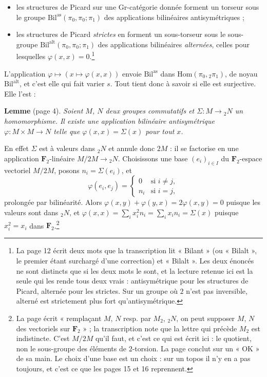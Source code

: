 \documentclass[11pt,a4paper]{article}
\begin{document}
\begin{itemize}
\item les structures de Picard sur une Gr-catégorie donnée forment un torseur
sous le groupe $\mathrm{Bil}^{\mathrm{as}}(\pi_{0}, \pi_{0}; \pi_{1})$ des
applications bilinéaires antisymétriques ;
\item les structures de Picard \emph{strictes} en forment un sous-torseur sous
le sous-groupe $\mathrm{Bil}^{\mathrm{alt}}(\pi_{0}, \pi_{0}; \pi_{1})$ des
applications bilinéaires \emph{alternées}, celles pour lesquelles
$\varphi(x,x) = 0$.\footnote{La page 12 écrit deux mots que la transcription
lit « Bilant » (ou « Bilalt », le premier étant surchargé d'une correction)
et « Bilalt ». Les deux énoncés ne sont distincts que si les deux mots le
sont, et la lecture retenue ici est la seule qui les rende tous deux vrais :
antisymétrique pour les structures de Picard, alternée pour les strictes. Sur
un groupe où $2$ n'est pas inversible, alterné est strictement plus fort
qu'antisymétrique.}
\end{itemize}

L'application $\varphi \mapsto (x \mapsto \varphi(x,x))$ envoie
$\mathrm{Bil}^{\mathrm{as}}$ dans $\mathrm{Hom}(\pi_{0}, {}_{2}\pi_{1})$, de
noyau $\mathrm{Bil}^{\mathrm{alt}}$, et c'est elle qui fait varier $s$. Tout
tient donc à savoir si elle est surjective. Elle l'est :

\textbf{Lemme} (page 4). \emph{Soient $M$, $N$ deux groupes commutatifs et
$\Sigma : M \to {}_{2}N$ un homomorphisme. Il existe une application
bilinéaire antisymétrique $\varphi : M \times M \to N$ telle que
$\varphi(x,x) = \Sigma(x)$ pour tout $x$.}

En effet $\Sigma$ est à valeurs dans ${}_{2}N$ et annule donc $2M$ : il se
factorise en une application $\mathbf{F}_{2}$-linéaire $M/2M \to {}_{2}N$.
Choisissons une base $(e_{i})_{i \in I}$ du $\mathbf{F}_{2}$-espace vectoriel
$M/2M$, posons $n_{i} = \Sigma(e_{i})$, et
\[
\varphi(e_{i}, e_{j}) =
\begin{cases}
0 & \text{si } i \neq j,\\
n_{i} & \text{si } i = j,
\end{cases}
\]
prolongée par bilinéarité. Alors $\varphi(x,y) + \varphi(y,x) = 2\varphi(x,y)
= 0$ puisque les valeurs sont dans ${}_{2}N$, et $\varphi(x,x) = \sum_{i}
x_{i}^{2} n_{i} = \sum_{i} x_{i} n_{i} = \Sigma(x)$ puisque $x_{i}^{2} =
x_{i}$ dans $\mathbf{F}_{2}$.\footnote{La page écrit « remplaçant $M$, $N$
resp. par $M_{2}$, ${}_{2}N$, on peut supposer $M$, $N$ des vectoriels sur
$\mathbf{F}_{2}$ » ; la transcription note que la lettre qui précède $M_{2}$
est indistincte. C'est $M/2M$ qu'il faut, et c'est ce qui est écrit ici : le
quotient, non le sous-groupe des éléments de $2$-torsion. La page conclut sur
un « OK » de sa main. Le choix d'une base est un choix : sur un topos il n'y
en a pas toujours, et c'est ce que les pages 15 et 16 reprennent.}
\end{document}
